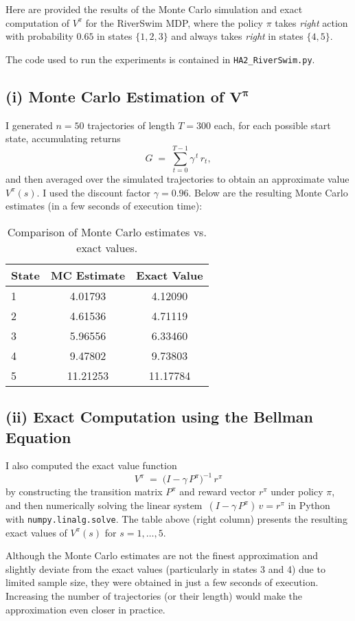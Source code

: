Here are  provided the results of the Monte Carlo simulation and exact computation of 
\(V^\pi\) for the RiverSwim MDP, where the policy \(\pi\) takes \emph{right} action 
with probability \(0.65\) in states \(\{1,2,3\}\) and always takes \emph{right} 
in states \(\{4,5\}\).

The code used to run the experiments is contained in 
\texttt{HA2\_RiverSwim.py}.

\medskip

\noindent
\subsection*{(i) Monte Carlo Estimation of \(\boldsymbol{V^\pi}\)}

\noindent
I generated \(n=50\) trajectories of length \(T=300\) each, for each possible start state, 
accumulating returns
\[
  G \;=\;\sum_{t=0}^{T-1}\gamma^{\,t}\,r_t,
\]
and then averaged over the simulated trajectories to obtain 
an approximate value \(V^\pi(s)\). 
I used the discount factor \(\gamma = 0.96\). 
Below are the resulting Monte Carlo estimates (in a few seconds of execution time):

\begin{table}[H]
  \centering
  \begin{tabular}{l|c|c}
  \hline
  \textbf{State} & \textbf{MC Estimate} & \textbf{Exact Value} \\
  \hline
  1 & 4.01793 & 4.12090 \\
  2 & 4.61536 & 4.71119 \\
  3 & 5.96556 & 6.33460 \\
  4 & 9.47802 & 9.73803 \\
  5 & 11.21253 & 11.17784 \\
  \hline
  \end{tabular}
  \caption{Comparison of Monte Carlo estimates vs. exact values.}
  \label{tab:mc-vs-exact}
\end{table}
  

\noindent
\subsection*{(ii) Exact Computation using the Bellman Equation}

\noindent
I also computed the exact value function 
\[
   V^\pi \;=\;\bigl(I - \gamma\,P^\pi\bigr)^{-1}\,r^\pi
\]
by constructing the transition matrix \(P^\pi\) and reward vector \(r^\pi\) under policy 
\(\pi\), and then numerically solving the linear system 
\(\,(I - \gamma\,P^\pi)\,v = r^\pi\) in Python with \texttt{numpy.linalg.solve}. 
The table above (right column) presents the resulting exact values of 
\(V^\pi(s)\) for \(s=1,\dots,5.\)

\medskip

Although the Monte Carlo estimates are not the finest approximation and slightly deviate 
from the exact values (particularly in states 3 and 4) due to limited sample size, 
they were obtained in just a few seconds of execution. Increasing the number of trajectories 
(or their length) would make the approximation even closer in practice.